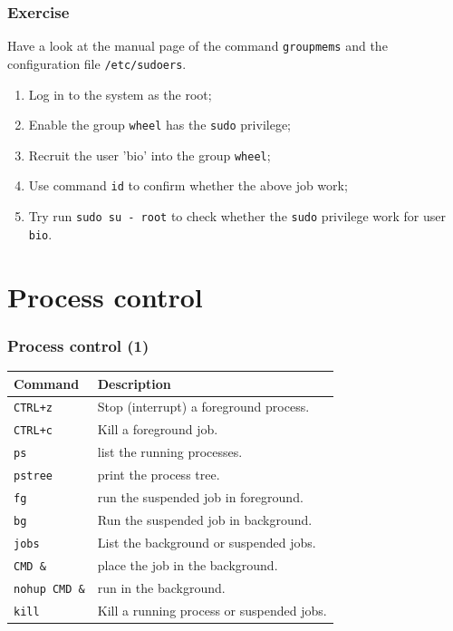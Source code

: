 \documentclass[red]{beamer}
\begin{document}
\begin{CJK*}{UTF8}{gbsn}
\begin{frame}[containsverbatim]
\frametitle{Exercise}
Have a look at the manual page of the command \lstinline{groupmems} and the 
configuration file \texttt{/etc/sudoers}.
\begin{enumerate}
	\item Log in to the system as the root;
	\item Enable the group \texttt{wheel} has the \lstinline{sudo} privilege;
	\item Recruit the user 'bio' into the group \texttt{wheel};
	\item Use command \lstinline{id} to confirm whether the above job work;
	\item Try run \lstinline{sudo su - root} to check whether the \lstinline{sudo}
		privilege work for user \texttt{bio}.
\end{enumerate}
\end{frame}

\section{Process control}

\begin{frame}[containsverbatim]
\frametitle{Process control (1)}
\begin{table}[ht]
\scriptsize
\renewcommand\arraystretch{1.6}
\begin{tabular}{ll}
\hline
\textbf{Command} & \textbf{Description}\\
\hline
\texttt{CTRL+z} & Stop (interrupt) a foreground process.\\
\texttt{CTRL+c} & Kill a foreground job.\\
\texttt{ps} & list the running processes.\\
\texttt{pstree} & print the process tree.\\
\texttt{fg} & run the suspended job in foreground.\\
\texttt{bg} & Run the suspended job in background.\\
\texttt{jobs} & List the background or suspended jobs.\\
\texttt{CMD \&} & place the job in the background.\\
\texttt{nohup CMD \&} & run in the background.\\
\texttt{kill} & Kill a running process or suspended jobs.\\
  
\hline
\end{tabular}
\end{table}
\end{frame}


\end{CJK*}
\end{document}
